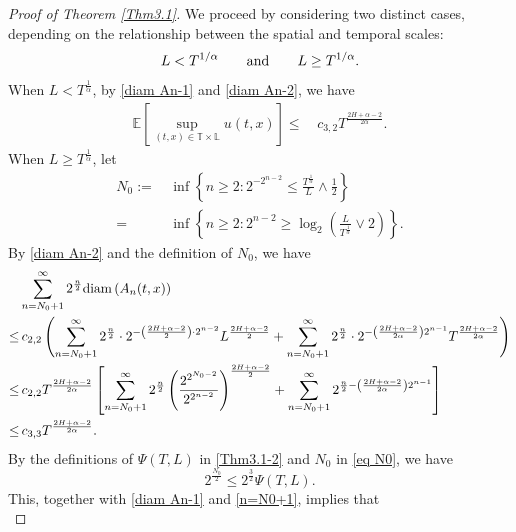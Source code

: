\documentclass[11pt,reqno]{amsart}
\numberwithin{equation}{section}
\def\EE{\mathbb{E}}
\def\bT{\mathbb{T}}
\def\bL{\mathbb{L}}
\newcommand\diam { {\rm{diam\,}}}
\newcommand{\1}{{\bf 1}}
\newcommand{\2}{{\bf 2}}
\newcommand{\lc}{\left(}
\newcommand{\rc}{\right)}
\newcommand{\lk}{\left[}
\newcommand{\rk}{\right]}
\begin{document}
\begin{proof}[Proof of Theorem \ref{Thm3.1}]
We proceed by considering two distinct cases, depending on the relationship between the spatial and temporal scales:
$$
     L < T^{1/\alpha}\qquad{\rm and}\qquad L \geq T^{1/\alpha}.
$$
   When $L<T^{\frac{1}{\alpha}}$, by \eqref{diam An-1} and \eqref{diam An-2}, we have
 \begin{equation}\label{upper-Eu-1}
 \begin{split}
  \EE \lk\sup_{(t,x)\in\bT\times\bL}u(t,x)\rk
  \leq&\, c_{3,2}T^{\frac{2H+\alpha-2}{2\alpha}}.
  \end{split}
\end{equation}
   When $L\geq T^{\frac{1}{\alpha}}$,
let
\begin{equation}\label{eq N0}
\begin{split}
N_0:=&\, \inf\left\{n\geq2: 2^{-2^{n-2}} \leq \frac{T^{\frac{1}{\alpha}}}{L}\wedge \frac12 \right\}\\
=&\, \inf\left\{n\geq2: 2^{n-2}\geq \log_2\left(\frac{L}{T^{\frac{1}{\alpha}}} \vee 2\right)\right\}.
\end{split}
\end{equation}
By \eqref{diam An-2} and the definition of $N_0$, we have
\begin{equation}\label{n=N0+1}
\begin{split}
&\sum_{n= N_0+1}^{\infty}2^{\frac{n}{2}} \diam(A_n(t,x)) \\
\leq&\, c_{2,2}\left(
\sum_{n= N_0+1}^{\infty}2^{\frac{n}{2}}\cdot 2^{-\lc \frac{2H+\alpha-2}{2}\rc \cdot 2^{n-2}} L^{\frac{2H+\alpha-2}{2}}
+\sum_{n= N_0+1}^{\infty}2^{\frac{n}{2}}\cdot
2^{-\lc\frac{2H+\alpha-2}{2\alpha}\rc  2^{n-1}} T^{\frac{2H+\alpha-2}{2\alpha}}\right) \\
\leq&\, c_{2,2}T^{\frac{2H+\alpha-2}{2\alpha}} \left[
\sum_{n= N_0+1}^{\infty}2^{\frac{n}{2}}
\left(\frac{2^{2^{N_0-2}}}{2^{2^{n-2}}}\right)^{\frac{2H+\alpha-2}{2}}
     + \sum_{n= N_0+1}^{\infty} 2^{\frac{n}{2}-\lc\frac{2H+\alpha-2}{2\alpha}\rc 2^{n-1}}\right] \\
\leq&\, c_{3,3}T^{\frac{2H+\alpha-2}{2\alpha}}.
  \end{split}
  \end{equation}
By the definitions  of $\Psi(T, L)$  in  \eqref{Thm3.1-2} and $N_0$ in \eqref{eq N0}, we have  
\begin{equation}\label{N0-upper}
2^{\frac{N_0}{2}}\leq2^{\frac32}\Psi(T, L).
\end{equation}
This, together with  \eqref{diam An-1} and \eqref{n=N0+1}, implies that
\begin{equation}\label{upper-Eu-2}

\end{equation}
\end{proof}
\end{document}
